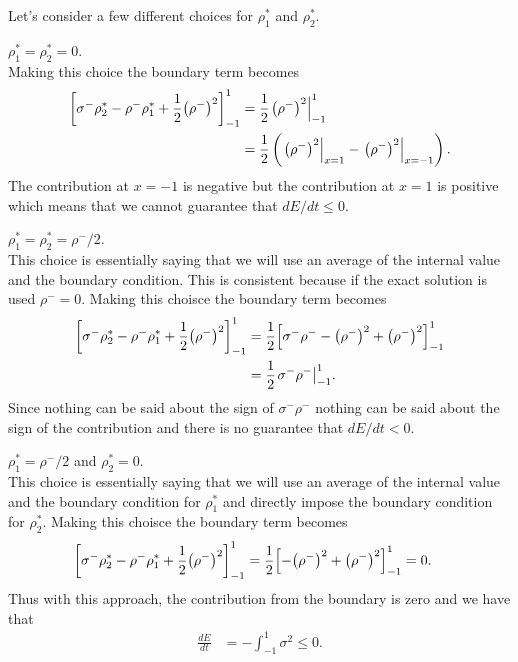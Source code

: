 \documentclass{report}
\begin{document}
Let's consider a few different choices for $\rho^{*}_{1}$ and $\rho^{*}_{2}$.

\medskip
{} $\rho^{*}_{1} = \rho^{*}_{2} = 0$.\\
Making this choice the boundary term becomes
\begin{align}
  \notag
  {\left[\sigma^{-}\rho_{2}^{*}
  -
  \rho^{-}\rho_{1}^{*} + \frac{1}{2}
  {\left(\rho^{-}\right)}^{2}\right]}_{-1}^{1}
  &=
  \frac{1}{2}
  {\left.
  {\left(\rho^{-}\right)}^{2}
  \right|}_{-1}^{1}\\
  &=
  \frac{1}{2}
  \left(
  {\left.
  {\left(\rho^{-}\right)}^{2}
  \right|}_{x=1}
  -
  {\left.
  {\left(\rho^{-}\right)}^{2}
  \right|}_{x=-1}
  \right).
\end{align}
The contribution at $x=-1$ is negative but the contribution at $x=1$ is positive
which means that we cannot guarantee that $dE/dt \le 0$.

\medskip
{} $\rho^{*}_{1} = \rho^{*}_{2} = \rho^{-}/2$.\\
This choice is essentially saying that we will use an average of the internal
value and the boundary condition. This is consistent because if the exact
solution is used $\rho^{-} = 0$.
Making this choisce the boundary term becomes
\begin{align}
  \notag
  {\left[\sigma^{-}\rho_{2}^{*}
  -
  \rho^{-}\rho_{1}^{*} + \frac{1}{2}
  {\left(\rho^{-}\right)}^{2}\right]}_{-1}^{1}
  &=
  \frac{1}{2}
  {\left[\sigma^{-}\rho^{-}
  -
  {\left(\rho^{-}\right)}^{2} +
  {\left(\rho^{-}\right)}^{2}\right]}_{-1}^{1}\\
  &=
  \frac{1}{2} {\left.\sigma^{-}\rho^{-} \right|}_{-1}^{1}.
\end{align}
Since nothing can be said about the sign of $\sigma^{-}\rho^{-}$ nothing can be
said about the sign of the contribution and there is no guarantee that $dE/dt <
0$.

 $\rho^{*}_{1} = \rho^{-}/2$ and $\rho^{*}_{2} = 0$.\\
This choice is essentially saying that we will use an average of the internal
value and the boundary condition for $\rho^{*}_{1}$ and directly impose the
boundary condition for $\rho^{*}_{2}$.
Making this choisce the boundary term becomes
\begin{align}
  \notag
  {\left[\sigma^{-}\rho_{2}^{*}
  -
  \rho^{-}\rho_{1}^{*} + \frac{1}{2}
  {\left(\rho^{-}\right)}^{2}\right]}_{-1}^{1}
  &=
  \frac{1}{2}
  {\left[
  -
  {\left(\rho^{-}\right)}^{2} +
  {\left(\rho^{-}\right)}^{2}\right]}_{-1}^{1}
  = 0.
\end{align}
Thus with this approach, the contribution from the boundary is zero and we have
that
\begin{align}
  \frac{d E}{dt} &=
  -\int_{-1}^{1} \sigma^2
  \le 0.
\end{align}
\end{document}
